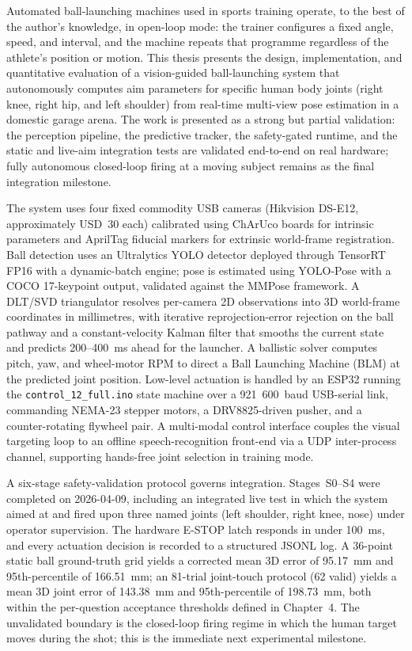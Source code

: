
Automated ball-launching machines used in sports training operate, to the best of the author's knowledge, in open-loop mode: the trainer configures a fixed angle, speed, and interval, and the machine repeats that programme regardless of the athlete's position or motion. This thesis presents the design, implementation, and quantitative evaluation of a vision-guided ball-launching system that autonomously computes aim parameters for specific human body joints (right knee, right hip, and left shoulder) from real-time multi-view pose estimation in a domestic garage arena. The work is presented as a strong but partial validation: the perception pipeline, the predictive tracker, the safety-gated runtime, and the static and live-aim integration tests are validated end-to-end on real hardware; fully autonomous closed-loop firing at a moving subject remains as the final integration milestone.

The system uses four fixed commodity USB cameras (Hikvision DS-E12, approximately USD~30 each) calibrated using ChArUco boards for intrinsic parameters and AprilTag fiducial markers for extrinsic world-frame registration. Ball detection uses an Ultralytics YOLO detector deployed through TensorRT FP16 with a dynamic-batch engine; pose is estimated using YOLO-Pose with a COCO 17-keypoint output, validated against the MMPose framework. A DLT/SVD triangulator resolves per-camera 2D observations into 3D world-frame coordinates in millimetres, with iterative reprojection-error rejection on the ball pathway and a constant-velocity Kalman filter that smooths the current state and predicts 200--400~ms ahead for the launcher. A ballistic solver computes pitch, yaw, and wheel-motor RPM to direct a Ball Launching Machine (BLM) at the predicted joint position. Low-level actuation is handled by an ESP32 running the \texttt{control\_12\_full.ino} state machine over a 921~600~baud USB-serial link, commanding NEMA-23 stepper motors, a DRV8825-driven pusher, and a counter-rotating flywheel pair. A multi-modal control interface couples the visual targeting loop to an offline speech-recognition front-end via a UDP inter-process channel, supporting hands-free joint selection in training mode.

A six-stage safety-validation protocol governs integration. Stages~S0--S4 were completed on 2026-04-09, including an integrated live test in which the system aimed at and fired upon three named joints (left shoulder, right knee, nose) under operator supervision. The hardware E-STOP latch responds in under 100~ms, and every actuation decision is recorded to a structured JSONL log. A 36-point static ball ground-truth grid yields a corrected mean 3D error of 95.17~mm and 95th-percentile of 166.51~mm; an 81-trial joint-touch protocol (62 valid) yields a mean 3D joint error of 143.38~mm and 95th-percentile of 198.73~mm, both within the per-question acceptance thresholds defined in Chapter~4. The unvalidated boundary is the closed-loop firing regime in which the human target moves during the shot; this is the immediate next experimental milestone.
